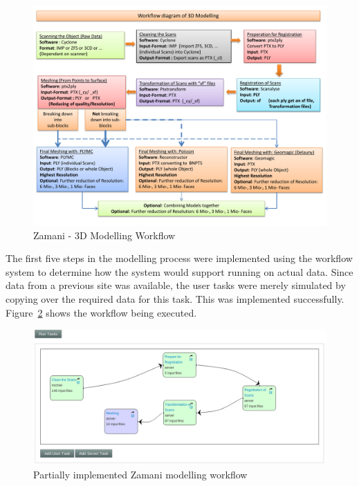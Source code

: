 \begin{figure}[!h]
    \begin{center}
        \includegraphics[scale=0.65]{figures/zamani_workflow.pdf}
    \end{center}
    \caption{Zamani - 3D Modelling Workflow}
    \label{eval:zamani}
\end{figure}
The first five steps in the modelling process were implemented using the workflow
system to determine how the system would support running on actual data. Since
data from a previous site was available, the user tasks were merely simulated
by copying over the required data for this task. This was implemented
successfully. Figure~\ref{eval:zamani_impl} shows the workflow being executed.

\begin{figure}[!h]
    \begin{center}
        \includegraphics[scale=0.45]{figures/zamani_impl.png}
    \end{center}
    \caption{Partially implemented Zamani modelling workflow}
    \label{eval:zamani_impl}
\end{figure}

